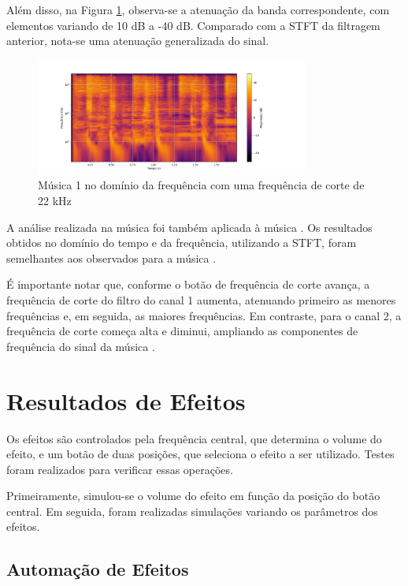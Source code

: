 Além disso, na Figura \ref{fig31}, observa-se a atenuação da banda correspondente, com elementos variando de 10 dB a -40 dB. Comparado com a STFT da filtragem anterior, nota-se uma atenuação generalizada do sinal.

\begin{figure}[h]
    \centering
    \includegraphics[width=0.8\textwidth]{figuras/fig31.png}
    \caption{Música 1 no domínio da frequência com uma frequência de corte de 22 kHz}
    \label{fig31}
\end{figure}

A análise realizada na música \cite{track01} foi também aplicada à música \cite{track02}. Os resultados obtidos no domínio do tempo e da frequência, utilizando a STFT, foram semelhantes aos observados para a música \cite{track01}.

É importante notar que, conforme o botão de frequência de corte avança, a frequência de corte do filtro do canal 1 aumenta, atenuando primeiro as menores frequências e, em seguida, as maiores frequências. Em contraste, para o canal 2, a frequência de corte começa alta e diminui, ampliando as componentes de frequência do sinal da música \cite{track02}.

\section{Resultados de Efeitos}

Os efeitos são controlados pela frequência central, que determina o volume do efeito, e um botão de duas posições, que seleciona o efeito a ser utilizado. Testes foram realizados para verificar essas operações.

Primeiramente, simulou-se o volume do efeito em função da posição do botão central. Em seguida, foram realizadas simulações variando os parâmetros dos efeitos.

\subsection{Automação de Efeitos}

